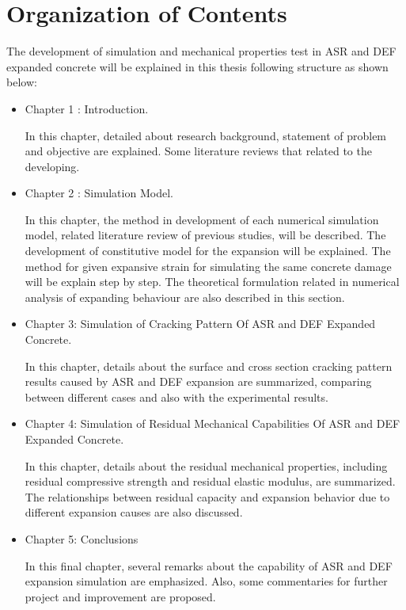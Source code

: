 \section{Organization of Contents}

The development of simulation and mechanical properties test in ASR and DEF expanded concrete will be explained in this thesis following structure as shown below:

\begin{itemize}

    \item Chapter 1 : Introduction.

    In this chapter, detailed about research background, statement of problem and objective are explained. Some literature reviews that related to the developing.

    \item Chapter 2 : Simulation Model.

    In this chapter, the method in development of each numerical simulation model, related literature review of previous studies, will be described. The development of constitutive model for the expansion will be explained. The method for given expansive strain for simulating the same concrete damage will be explain step by step. The theoretical formulation related in numerical analysis of expanding behaviour are also described in this section.

    \item Chapter 3: Simulation of Cracking Pattern Of ASR and DEF Expanded Concrete.

    In this chapter, details about the surface and cross section cracking pattern results caused by ASR and DEF expansion are summarized, comparing between different cases and also with the experimental results.

    \item Chapter 4: Simulation of Residual Mechanical Capabilities Of ASR and DEF Expanded Concrete.

    In this chapter, details about the residual mechanical properties, including residual compressive strength and residual elastic modulus, are summarized. The relationships between residual capacity and expansion behavior due to different expansion causes are also discussed.

    \item Chapter 5: Conclusions

    In this final chapter, several remarks about the capability of ASR and DEF expansion simulation are emphasized. Also, some commentaries for further project and improvement are proposed.


\end{itemize}
